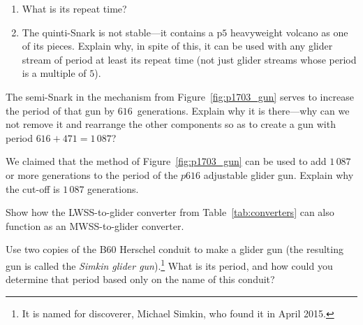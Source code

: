 \begin{multicols}{2}
\begin{problem}
\begin{enumerate}[label=\bf\color{ocre}(\alph*)]
		\item What is its repeat time?
		
		\item The quinti-Snark is not stable---it contains a p$5$ heavyweight volcano as one of its pieces. Explain why, in spite of this, it can be used with any glider stream of period at least its repeat time (not just glider streams whose period is a multiple of $5$).
	\end{enumerate}
\end{problem}

	
\mfilbreak


\begin{problem}\label{exer:p1703_gun_why_semisnark}
	The semi-Snark in the mechanism from Figure~\ref{fig:p1703_gun} serves to increase the period of that gun by $616$~generations. Explain why it is there---why can we not remove it and rearrange the other components so as to create a gun with period $616+471 = 1\, 087$?
\end{problem}


\mfilbreak


\begin{problem}\label{exer:p1703_gun}
	We claimed that the method of Figure~\ref{fig:p1703_gun} can be used to add $1\, 087$ or more generations to the period of the $p616$ adjustable glider gun. Explain why the cut-off is $1\, 087$ generations.
	
\end{problem}


\mfilbreak
	
	
\begin{problem}\label{exer:mwss_to_g}
	Show how the LWSS-to-glider converter from Table~\ref{tab:converters} can also function as an MWSS-to-glider converter.
\end{problem}


\mfilbreak


\begin{problem}\label{exer:simkin_glider_gun}
	Use two copies of the B60 Herschel conduit to make a glider gun (the resulting gun is called the \emph{Simkin glider gun}).\footnote{It is named for discoverer, Michael Simkin, who found it in April 2015.} What is its period, and how could you determine that period based only on the name of this conduit?
\end{problem}



\end{multicols}
